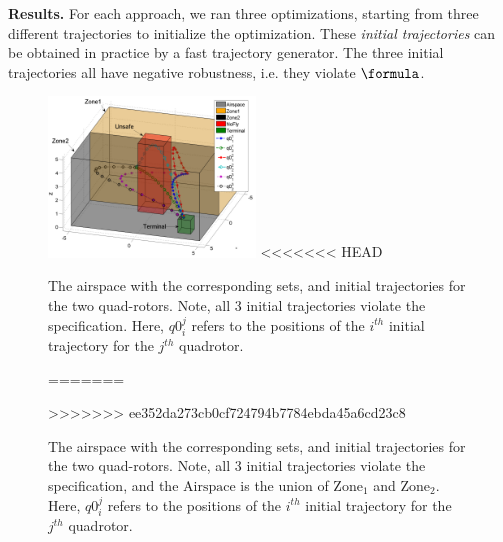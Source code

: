 \textbf{Results.}
For each approach, we ran three optimizations, starting from three different trajectories to initialize the optimization. 
These \textit{initial trajectories} can be obtained in practice by a fast trajectory generator. 
The three initial trajectories all have negative robustness, i.e. they violate $\formula$.
\begin{figure}[t]
\centering
\includegraphics[width=0.49\textwidth]{figures/QuadInitTrajs_scissored}
<<<<<<< HEAD
\caption{The airspace with the corresponding sets, and initial trajectories for the two quad-rotors. Note, all 3 initial trajectories violate the specification. Here, $q0_{i}^j$ refers to the positions of the $i^{th}$ initial trajectory for the $j^{th}$ quadrotor.} 
=======
\caption{The airspace with the corresponding sets, and initial trajectories for the two quad-rotors. Note, all 3 initial trajectories violate the specification, and the $\text{Airspace}$ is the union of $\text{Zone}_1$ and $\text{Zone}_2$. Here, $q0_{i}^j$ refers to the positions of the $i^{th}$ initial trajectory for the $j^{th}$ quadrotor.} 
>>>>>>> ee352da273cb0cf724794b7784ebda45a6cd23c8
\label{fig:quad_init}
\end{figure}

